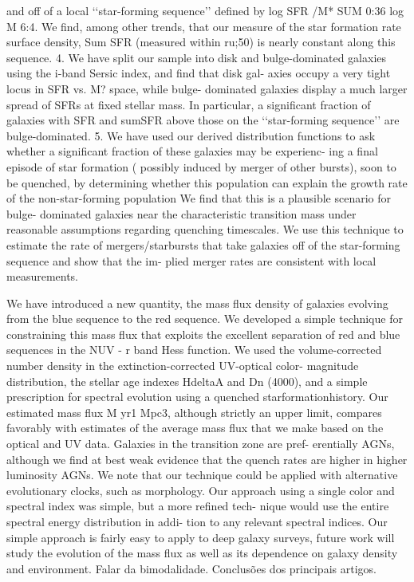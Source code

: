 and off of a local ‘‘star-forming sequence’’ defined by log SFR /M* SUM
0:36 log M 6:4. We find, among other trends, that our measure of the star
formation rate surface density, Sum SFR (measured within ru;50) is nearly
constant along this sequence. 4. We have split our sample into disk and bulge-dominated
galaxies using the i-band Sersic index, and find that disk gal- axies occupy a
very tight locus in SFR vs. M? space, while bulge- dominated galaxies display a
much larger spread of SFRs at fixed stellar mass. In particular, a significant
fraction of galaxies with SFR and sumSFR above those on the ‘‘star-forming
sequence’’ are bulge-dominated. 5. We have used our derived distribution
functions to ask whether a significant fraction of these galaxies may be
experienc- ing a final episode of star formation ( possibly induced by merger of
other bursts), soon to be quenched, by determining whether this population can
explain the growth rate of the non-star-forming population We find that this is
a plausible scenario for bulge- dominated galaxies near the characteristic
transition mass under reasonable assumptions regarding quenching timescales. We
use this technique to estimate the rate of mergers/starbursts that take galaxies
off of the star-forming sequence and show that the im- plied merger rates are
consistent with local measurements.


\cite{Martin2007}
We have introduced a new quantity, the mass flux density of galaxies evolving
from the blue sequence to the red sequence. We developed a simple technique for
constraining this mass flux that exploits the excellent separation of red and
blue sequences in the NUV - r band Hess function. We used the volume-corrected
number density in the extinction-corrected UV-optical color- magnitude
distribution, the stellar age indexes HdeltaA and Dn (4000), and a simple
prescription for spectral evolution using a quenched
starformationhistory. Our estimated mass flux M yr1 Mpc3,
although strictly an upper limit, compares favorably with estimates of the
average mass flux that we make based on the optical and UV data. Galaxies in the
transition zone are pref- erentially AGNs, although we find at best weak
evidence that the quench rates are higher in higher luminosity AGNs. We note
that our technique could be applied with alternative evolutionary clocks, such
as morphology. Our approach using a single color and spectral index was simple,
but a more refined tech- nique would use the entire spectral energy distribution
in addi- tion to any relevant spectral indices. Our simple approach is fairly
easy to apply to deep galaxy surveys, future work will study the evolution of
the mass flux as well as its dependence on galaxy density and environment. Falar
da bimodalidade. Conclusões dos principais artigos.


